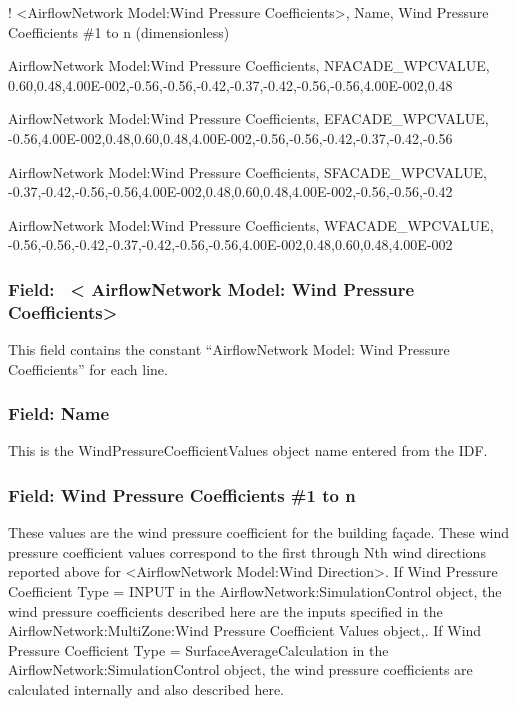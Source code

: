 ! \textless{}AirflowNetwork Model:Wind Pressure Coefficients\textgreater{}, Name, Wind Pressure Coefficients \#1 to n (dimensionless)

AirflowNetwork Model:Wind Pressure Coefficients, NFACADE\_WPCVALUE, 0.60,0.48,4.00E-002,-0.56,-0.56,-0.42,-0.37,-0.42,-0.56,-0.56,4.00E-002,0.48

AirflowNetwork Model:Wind Pressure Coefficients, EFACADE\_WPCVALUE, -0.56,4.00E-002,0.48,0.60,0.48,4.00E-002,-0.56,-0.56,-0.42,-0.37,-0.42,-0.56

AirflowNetwork Model:Wind Pressure Coefficients, SFACADE\_WPCVALUE, -0.37,-0.42,-0.56,-0.56,4.00E-002,0.48,0.60,0.48,4.00E-002,-0.56,-0.56,-0.42

AirflowNetwork Model:Wind Pressure Coefficients, WFACADE\_WPCVALUE, -0.56,-0.56,-0.42,-0.37,-0.42,-0.56,-0.56,4.00E-002,0.48,0.60,0.48,4.00E-002

\subsubsection{Field:~ \textless{} AirflowNetwork Model: Wind Pressure Coefficients\textgreater{}}\label{field-airflownetwork-model-wind-pressure-coefficients}

This field contains the constant ``AirflowNetwork Model: Wind Pressure Coefficients'' for each line.

\subsubsection{Field: Name}\label{field-name}

This is the WindPressureCoefficientValues object name entered from the IDF.

\subsubsection{Field: Wind Pressure Coefficients \#1 to n}\label{field-wind-pressure-coefficients-1-to-n}

These values are the wind pressure coefficient for the building façade. These wind pressure coefficient values correspond to the first through Nth wind directions reported above for \textless{}AirflowNetwork Model:Wind Direction\textgreater{}. If Wind Pressure Coefficient Type = INPUT in the AirflowNetwork:SimulationControl object, the wind pressure coefficients described here are the inputs specified in the AirflowNetwork:MultiZone:Wind Pressure Coefficient Values object,. If Wind Pressure Coefficient Type = SurfaceAverageCalculation in the AirflowNetwork:SimulationControl object, the wind pressure coefficients are calculated internally and also described here.

